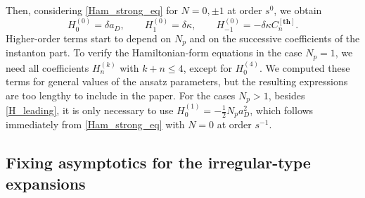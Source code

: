 \documentclass[12pt,a4paper]{article}
\numberwithin{equation}{section}
\newcommand{\D}{\scriptscriptstyle{D}}
\begin{document}
Then, considering \eqref{Ham_strong_eq} for $N=0,\pm1$ at order $s^0$, we obtain
\begin{equation}\label{H_leading}
H_{0}^{(0)}=\delta a_{\D}, \qquad H_{1}^{(0)}=\delta\kappa, \qquad H_{-1}^{(0)}=-\delta \kappa C_n^{[\mathbf{th}]}.  
\end{equation}
Higher-order terms start to depend on $N_p$ and on the successive coefficients of the instanton part. To verify the Hamiltonian-form equations in the case $N_p=1$, we need all coefficients $H^{(k)}_n$ with $k+n\leq 4$, except for $H_0^{(4)}$. We computed these terms for general values of the ansatz parameters, but the resulting expressions are too lengthy to include in the paper. For the cases $N_p>1$, besides \eqref{H_leading}, it is only necessary to use $H_0^{(1)}=-\frac12N_pa_{\D}^2$, which follows immediately from \eqref{Ham_strong_eq} with $N=0$ at order $s^{-1}$.


\subsection{Fixing asymptotics for the irregular-type expansions}
\label{ssec:fixing}
\end{document}
